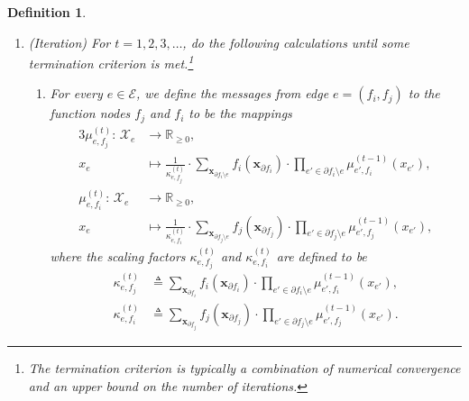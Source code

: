 \documentclass[journal]{IEEEtran}
\newtheorem{definition}[theorem]{Definition}
\newcommand{\vect}[1]{ \bm{#1} }
\newcommand{\set}[1]{\mathcal{#1}}
\newcommand{\setEfull}{ \mathcal{E} }
\newcommand{\setpf}{ \partial f }
\newcommand{\sR}{\mathbb{R}}
\newcommand{\vx}{ \vect{x} }
\newcommand{\defeq}{ \triangleq }
\newcommand{\efi}{ e,f_i }
\newcommand{\efj}{ e,f_j }
\newcommand{\epfi}{ e',f_i }
\newcommand{\epfj}{ e',f_j }
\newcommand{\setpfi}{ \partial f_{i} }
\newcommand{\setpfj}{ \partial f_{j} }
\newcommand{\xfi}{ \bm{x}_{\setpf_i} }
\newcommand{\xfj}{ \bm{x}_{\setpf_j} }
\begin{document}
\begin{definition}
\begin{enumerate}
    \item (Iteration) For $t = 1, 2, 3, \ldots$, do the following calculations
          until some termination criterion is met.\footnote{The termination
            criterion is typically a combination of numerical convergence and an
            upper bound on the number of iterations.}
          \begin{enumerate}
            \item\label{SPA: update message} For every $e \in \setEfull$,
                  we define the messages from edge $ e = (f_{i}, f_{j}) $ to the function nodes
                  $ f_{j} $ and $ f_{i} $ to be the mappings
                  \begin{alignat*}{3}
                    \mu_{\efj}^{(t)}:\, \set{X}_{e} & \to \sR_{\geq 0}, \\
                    x_{e}                           & \mapsto
                    \frac{1}{\kappa_{\efj}^{(t)}}
                    \cdot
                    \sum_{\vx_{ \setpfi \setminus e }}
                    f_{i}(\xfi)
                    \cdot \!\!\!\! \prod_{e' \in \setpfi \setminus e}\!\!\!\!
                    \mu_{\epfi}^{(t-1)}(x_{e'}), \nonumber
                    \\
                    \mu_{\efi}^{(t)}:\, \set{X}_{e} & \to \sR_{\geq 0}, \\
                    x_{e}                           & \mapsto
                    \frac{1}{\kappa_{\efi}^{(t)}}
                    \cdot
                    \sum_{ \vx_{ \setpfj \setminus e } }
                    f_{j}(\xfj)
                    \cdot \!\!\!\! \prod_{e' \in \setpfj \setminus e}\!\!\!\!
                    \mu_{\epfj}^{(t-1)}(x_{e'}), \nonumber
                  \end{alignat*}
                  where the scaling factors $ \kappa_{\efj}^{(t)} $ and $ \kappa_{\efi}^{(t)} $ are defined to be
                  \begin{align*}
                    \kappa_{\efj}^{(t)}
                                        & \defeq
                    \sum_{\xfi}
                    f_{i}(\xfi)
                    \cdot
                    \prod_{e' \in \setpfi \setminus e}
                    \mu_{\epfi}^{(t-1)}(x_{e'}),
                    \nonumber                    \\
                    \kappa_{\efi}^{(t)} & \defeq
                    \sum_{\xfj}
                    f_{j}(\xfj)
                    \cdot
                    \prod_{e' \in \setpfj \setminus e}
                    \mu_{\epfj}^{(t-1)}(x_{e'}).

\end{align*}
\end{enumerate}
\end{enumerate}
\end{definition}
\end{document}
